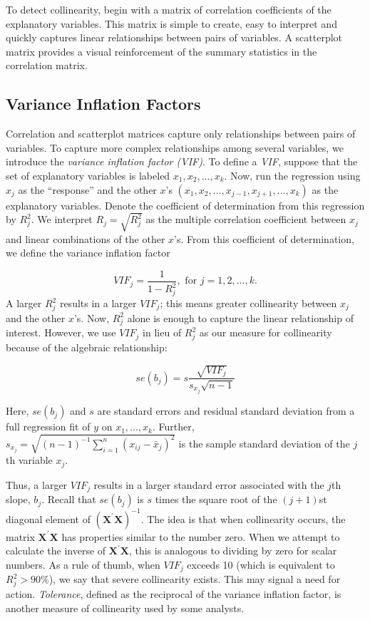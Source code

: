 To detect collinearity, begin with a matrix of correlation
coefficients of the explanatory variables. This matrix is simple to
create, easy to interpret and  quickly captures linear relationships
between pairs of variables. A scatterplot matrix provides a visual
reinforcement of the summary statistics in the correlation matrix.


\subsection{Variance Inflation Factors}

Correlation and scatterplot matrices capture only relationships
between pairs of variables. To capture more complex relationships
among several variables, we introduce the \textit{variance inflation
factor (VIF)}. To define a \textit{VIF}, suppose that the set of
explanatory variables is labeled $x_1,x_2,...,x_{k}$. Now, run the
regression using $x_j$ as
the ``response'' and the other $x$'s $%
(x_1,x_2,...,x_{j-1},x_{j+1},...,x_{k})$ as the explanatory
variables. Denote the coefficient of determination from this
regression by $R_j^2$. We interpret $R_j=\sqrt{R_j^2}$ as the
multiple correlation coefficient between $x_j$ and linear
combinations of the other $x$'s. From this coefficient of
determination, we define the variance inflation factor

\begin{equation*}
VIF_j=\frac{1}{1-R_j^2},\text{ \ \ \ for \ }j=1,2,...,k.
\end{equation*}
A larger $R_j^2$ results in a larger $VIF_j$; this means greater
collinearity between $x_j$ and the other $x$'s. Now, $R_j^2$ alone
is enough to capture the linear relationship of interest. However,
we use $VIF_j$ in lieu of $R_j^2$ as our measure for collinearity
because of the algebraic relationship:

\begin{equation} \label{E5:SEsAndVIFs}
se(b_j) = s \frac{\sqrt{VIF_j}}{s_{x_j}\sqrt{n-1}}
\end{equation}

\noindent Here, $se(b_j)$ and $s$ are standard errors and residual
standard deviation from a full regression fit of $y$ on
$x_1,...,x_{k}$. Further, $s_{x_j} = \sqrt{(n-1)^{-1}
\sum_{i=1}^{n}(x_{ij}-\bar{x}_j)^2 }$ is the sample standard
deviation of the $j$th variable $x_j$.

Thus, a larger $VIF_j$ results in a larger standard error associated
with the $j$th slope, $b_j$. Recall that $se(b_j)$ is $s$ times the
square root of the $(j+1)$st diagonal element of
$(\mathbf{X^{\prime} X})^{-1}$. The idea is that when collinearity
occurs, the matrix $\mathbf{X^{\prime}X}$ has properties similar to
the number zero. When we attempt to calculate the inverse of
$\mathbf{X^{\prime} X}$, this is analogous to dividing by zero for
scalar numbers. As a rule of thumb, when $VIF_j$ exceeds 10 (which
is equivalent to $R_j^2>90\%$), we say that severe collinearity
exists. This may signal a need for action. \emph{Tolerance}, defined
as the reciprocal of the variance inflation factor, is another
measure of collinearity used by some analysts.

